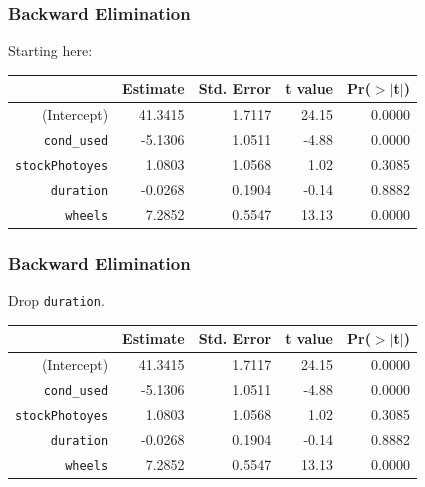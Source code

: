 \documentclass[handout]{beamer}
\newcommand{\blue}[1]{\textcolor{blue2}{#1}}
\begin{document}
\begin{frame}[fragile]
\frametitle{Backward Elimination}
Starting here:

\begin{table}[ht]
\centering
\begin{tabular}{r|rrrr}
  \hline
 & Estimate & Std. Error & t value & Pr($>$$|$t$|$) \\ 
  \hline
(Intercept) & 41.3415 & 1.7117 & 24.15 & 0.0000 \\ 
  {\tt cond\_used} & -5.1306 & 1.0511 & -4.88 & 0.0000 \\ 
  {\tt stockPhotoyes} & 1.0803 & 1.0568 & 1.02 & 0.3085 \\ 
  {\tt duration} & -0.0268 & 0.1904 & -0.14 & 0.8882 \\ 
  {\tt wheels} & 7.2852 & 0.5547 & 13.13 & 0.0000 \\ 
   \hline
\end{tabular}
\end{table}

\end{frame}


\begin{frame}[fragile]
\frametitle{Backward Elimination}
Drop {\tt duration}.

\begin{table}[ht]
\centering
\begin{tabular}{r|rrrr}
  \hline
 & Estimate & Std. Error & t value & Pr($>$$|$t$|$) \\ 
  \hline
(Intercept) & 41.3415 & 1.7117 & 24.15 & 0.0000 \\ 
  {\tt cond\_used} & -5.1306 & 1.0511 & -4.88 & 0.0000 \\ 
  {\tt stockPhotoyes} & 1.0803 & 1.0568 & 1.02 & 0.3085 \\ 
  \blue{{\tt duration}} & \blue{-0.0268} & \blue{0.1904} & \blue{-0.14} & \blue{0.8882} \\ 
  {\tt wheels} & 7.2852 & 0.5547 & 13.13 & 0.0000 \\ 
   \hline
\end{tabular}
\end{table}

\end{frame}
\end{document}

